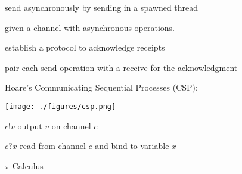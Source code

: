 \documentclass[landscape, a4paper]{article}
\begin{document}
\begin{minipage}[t]{0.2\linewidth}
\begin{betterlist}
\begin{betterlist}
			\begin{betterlist}
				\item send asynchronously by sending in a spawned thread
			\end{betterlist}
			\item given a channel with asynchronous operations.
			\begin{betterlist}
				\item establish a protocol to acknowledge receipts
				\item pair each send operation with a receive for the acknowledgment
			\end{betterlist}
		\end{betterlist}
		\item \alert{Hoare’s Communicating Sequential Processes (CSP)}:

		\texttt{[image: ./figures/csp.png]}
		\begin{betterlist}
			\item {}
			\begin{betterlist}
				\item $c!v$ output $v$ on channel $c$
				\item $c?x$ read from channel $c$ and bind to variable $x$
			\end{betterlist}
		\end{betterlist}
		\item \alert{$\pi$-Calculus}
	\end{betterlist}
\end{minipage}
\end{document}
